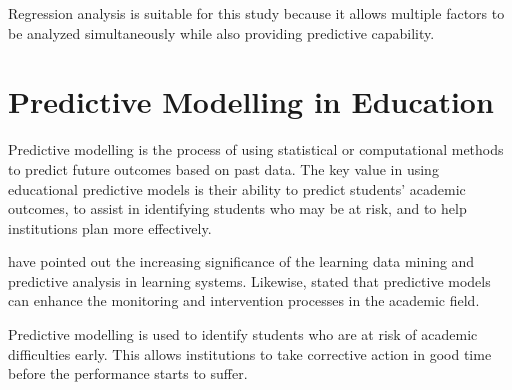 \documentclass[12pt]{report}
\begin{document}
	Regression analysis is suitable for this study because it allows multiple factors to be analyzed simultaneously while also providing predictive capability.
	
	\section{Predictive Modelling in Education}
	Predictive modelling is the process of using statistical or computational methods to predict future outcomes based on past data. The key value in using educational predictive models is their ability to predict students' academic outcomes, to assist in identifying students who may be at risk, and to help institutions plan more effectively.
	
	\citet{Romero2010} have pointed out the increasing significance of the learning data mining and predictive analysis in learning systems. Likewise, \citet{Shahiri2015} stated that predictive models can enhance the monitoring and intervention processes in the academic field.
	
	Predictive modelling is used to identify students who are at risk of academic difficulties early. This allows institutions to take corrective action in good time before the performance starts to suffer.
	
\end{document}
